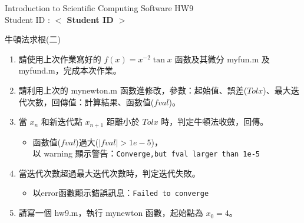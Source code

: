 \documentclass[12pt,a4paper]{article}
\newcommand{\placeholder}[1]{\textbf{$<$ #1 $>$}}
\newcommand{\idnumber}{\placeholder{Student ID}}
\begin{document}
\begin{CJK}{UTF8}{bsmi}
\begin{flushleft}Introduction to Scientific Computing Software HW9
\\Student ID : \idnumber{}\end{flushleft}

牛頓法求根(二)
\begin{enumerate}
\item 請使用上次作業寫好的 $f(x)=x^{-2}\tan x$ 函數及其微分 myfun.m 及 myfund.m，完成本次作業。
\item 請利用上次的 mynewton.m 函數進修改，參數：起始值、誤差($Tolx$)、最大迭代次數，回傳值：計算結果、函數值($fval$)。
\item 當 $x_n$ 和新迭代點 $x_{n+1}$ 距離小於 $Tolx$ 時，判定牛頓法收斂，回傳。
\begin{itemize}
\item 函數值($fval$)過大($|fval|>1e-5$)，\\以 warning 顯示警告：\texttt{Converge,but fval larger than 1e-5}
\end{itemize}
\item 當迭代次數超過最大迭代次數時，判定迭代失敗。
\begin{itemize}
\item 以error函數顯示錯誤訊息：\texttt{Failed to converge}
\end{itemize}
\item 請寫一個 hw9.m，執行 mynewton 函數，起始點為 $x_0=4$。

\end{enumerate}
\end{CJK}
\end{document}
